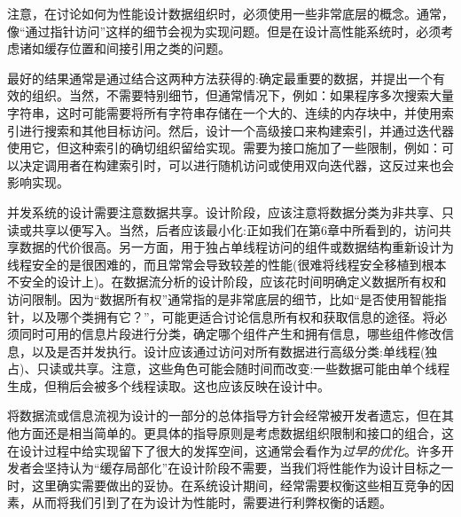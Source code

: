 注意，在讨论如何为性能设计数据组织时，必须使用一些非常底层的概念。通常，像“通过指针访问”这样的细节会视为实现问题。但是在设计高性能系统时，必须考虑诸如缓存位置和间接引用之类的问题。 

最好的结果通常是通过结合这两种方法获得的:确定最重要的数据，并提出一个有效的组织。当然，不需要特别细节，但通常情况下，例如：如果程序多次搜索大量字符串，这时可能需要将所有字符串存储在一个大的、连续的内存块中，并使用索引进行搜索和其他目标访问。然后，设计一个高级接口来构建索引，并通过迭代器使用它，但这种索引的确切组织留给实现。需要为接口施加了一些限制，例如：可以决定调用者在构建索引时，可以进行随机访问或使用双向迭代器，这反过来也会影响实现。 

并发系统的设计需要注意数据共享。设计阶段，应该注意将数据分类为非共享、只读或共享以便写入。当然，后者应该最小化:正如我们在第6章中所看到的，访问共享数据的代价很高。另一方面，用于独占单线程访问的组件或数据结构重新设计为线程安全的是很困难的，而且常常会导致较差的性能(很难将线程安全移植到根本不安全的设计上)。在数据流分析的设计阶段，应该花时间明确定义数据所有权和访问限制。因为“数据所有权”通常指的是非常底层的细节，比如“是否使用智能指针，以及哪个类拥有它？”，可能更适合讨论信息所有权和获取信息的途径。将必须同时可用的信息片段进行分类，确定哪个组件产生和拥有信息，哪些组件修改信息，以及是否并发执行。设计应该通过访问对所有数据进行高级分类:单线程(独占)、只读或共享。注意，这些角色可能会随时间而改变:一些数据可能由单个线程生成，但稍后会被多个线程读取。这也应该反映在设计中。 

将数据流或信息流视为设计的一部分的总体指导方针会经常被开发者遗忘，但在其他方面还是相当简单的。更具体的指导原则是考虑数据组织限制和接口的组合，这在设计过程中给实现留下了很大的发挥空间，这通常会看作为\textit{过早的优化}。许多开发者会坚持认为“缓存局部化”在设计阶段不需要，当我们将性能作为设计目标之一时，这里确实需要做出的妥协。在系统设计期间，经常需要权衡这些相互竞争的因素，从而将我们引到了在为设计为性能时，需要进行利弊权衡的话题。



































